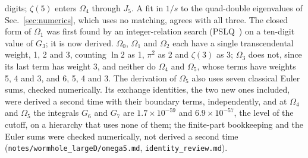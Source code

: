 \documentclass[11pt]{article}
\theoremstyle{remark}
\begin{document}
digits; $\zeta(5)$ enters $\Omega_4$ through $J_5$. A fit in $1/s$ to the quad-double eigenvalues of Sec.~\ref{sec:numerics}, which uses no matching, agrees with all
three. The closed form of $\Omega_1$ was first found by an integer-relation search (PSLQ~\cite{PSLQ1999}) on a
ten-digit value of $G_3$; it is now derived. $\Omega_0$, $\Omega_1$ and $\Omega_2$ each have a single transcendental
weight, 1, 2 and 3, counting $\ln2$ as 1, $\pi^2$ as 2 and $\zeta(3)$ as 3; $\Omega_3$ does not, since its last term has
weight 3, and neither do $\Omega_4$ and $\Omega_5$, whose terms have weights 5, 4 and 3, and 6, 5, 4 and 3. The derivation of $\Omega_5$
also uses seven classical Euler sums, checked numerically. Its exchange identities, the two new ones included, were derived a
second time with their boundary terms, independently, and at $\Omega_4$ and $\Omega_5$ the integrals $G_6$ and $G_7$ are $1.7\times10^{-59}$ and $6.9\times10^{-57}$, the level of
the cutoff, on a hierarchy that uses none of them; the finite-part bookkeeping and the Euler sums were checked numerically,
not derived a second time (\texttt{notes/wormhole\_largeD/omega5.md}, \texttt{identity\_review.md}).
\end{document}
